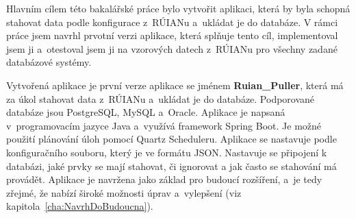 Hlavním cílem této bakalářské práce bylo vytvořit aplikaci, která by byla 
schopná stahovat data podle konfigurace z~RÚIANu a~ukládat je do databáze.
V rámci práce jsem navrhl prvotní verzi aplikace, která splňuje tento cíl,
implementoval jsem ji a~otestoval jsem ji na vzorových datech z~RÚIANu
pro všechny zadané databázové systémy.

Vytvořená aplikace je první verze aplikace se jménem \textbf{Ruian\_Puller}, 
která má za úkol stahovat data z~RÚIANu a~ukládat je do databáze.
Podporované databáze jsou PostgreSQL, MySQL a~Oracle.
Aplikace je napsaná v~programovacím jazyce Java a~využívá framework Spring Boot.
Je možné použití plánování úloh pomocí Quartz Scheduleru.
Aplikace se nastavuje podle konfiguračního souboru,
který je ve formátu JSON. Nastavuje se připojení k databázi,
jaké prvky se mají stahovat, či ignorovat a jak často se stahování má provádět.
Aplikace je navržena jako základ pro budoucí rozšíření, a~je tedy zřejmé, 
že nabízí široké možnosti úprav a~vylepšení (viz kapitola~\ref{cha:NavrhDoBudoucna}).

